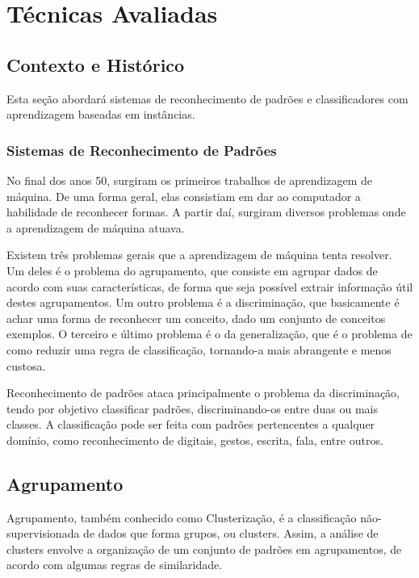 \chapter{Técnicas Avaliadas}
\label{ch:ch2}

\section{Contexto e Histórico}
\label{sec:contexto}

Esta seção abordará sistemas de reconhecimento de padrões e classificadores com aprendizagem baseadas em instâncias.

\subsection{Sistemas de Reconhecimento de Padrões}
\label{subsec:sistemas}

No final dos anos 50, surgiram os primeiros trabalhos de aprendizagem de máquina. De uma forma geral, elas consistiam em dar ao computador a habilidade de reconhecer formas. A partir daí, surgiram diversos problemas onde a aprendizagem de máquina atuava. 

Existem três problemas gerais que a aprendizagem de máquina tenta resolver. Um deles é o problema do agrupamento, que consiste em agrupar dados de acordo com suas características, de forma que seja possível extrair informação útil destes agrupamentos. Um outro problema é a discriminação, que basicamente é achar uma forma de reconhecer um conceito, dado um conjunto de conceitos exemplos. O terceiro e último problema é o da generalização, que é o problema de como reduzir uma regra de classificação, tornando-a mais abrangente e menos custosa.

Reconhecimento de padrões ataca principalmente o problema da discriminação, tendo por objetivo classificar padrões, discriminando-os entre duas ou mais classes. A classificação pode ser feita com padrões pertencentes a qualquer domínio, como reconhecimento de digitais, gestos, escrita, fala, entre outros.

\section{Agrupamento}

Agrupamento, também conhecido como Clusterização, é a classificação não-supervisionada de dados que forma grupos, ou clusters. Assim, a análise de clusters envolve a organização de um conjunto de padrões em agrupamentos, de acordo com algumas regras de similaridade.

